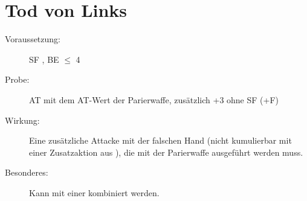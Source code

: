 \section{Tod von Links}
\label{bAT.tod_von_links}
\begin{description}
    \item[Voraussetzung:]
        SF , BE\textrm{ ${\leq}$ }4
    \item[Probe:]
        AT mit dem AT-Wert der Parierwaffe, zusätzlich +3 ohne SF  (+F)
    \item[Wirkung:]
        Eine zusätzliche Attacke mit der falschen Hand (nicht kumulierbar mit einer Zusatzaktion aus ), die mit der Parierwaffe ausgeführt werden muss.
    \item[Besonderes:]
        Kann mit einer  kombiniert werden.
\end{description}
